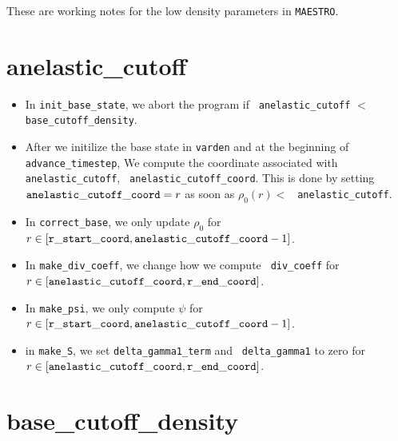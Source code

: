 These are working notes for the low density parameters in {\tt MAESTRO}.

\section{anelastic\_cutoff}

\begin{itemize}

\item In {\tt init\_base\_state}, we abort the program if {\tt
  anelastic\_cutoff} $<$ {\tt base\_cutoff\_density}.

\item After we initilize the base state in {\tt varden} and at the
  beginning of {\tt advance\_timestep}, We compute the coordinate
  associated with {\tt anelastic\_cutoff}, {\tt
    anelastic\_cutoff\_coord}.  This is done by setting ${\tt
    anelastic\_cutoff\_coord}= r$ as soon as $\rho_0(r) <$ {\tt
    anelastic\_cutoff}.

\item In {\tt correct\_base}, we only update $\rho_0$ for $r\in[{\tt
    r\_start\_coord},{\tt anelastic\_cutoff\_coord}-1]$.

\item In {\tt make\_div\_coeff}, we change how we compute {\tt
  div\_coeff} for $r\in[{\tt anelastic\_cutoff\_coord},{\tt
    r\_end\_coord}]$.

\item In {\tt make\_psi}, we only compute $\psi$ for $r\in[{\tt
    r\_start\_coord},{\tt anelastic\_cutoff\_coord}-1]$.

\item in {\tt make\_S}, we set {\tt delta\_gamma1\_term} and {\tt
  delta\_gamma1} to zero for $r\in[{\tt anelastic\_cutoff\_coord},{\tt
    r\_end\_coord}]$.
\end{itemize}

\section{base\_cutoff\_density}

